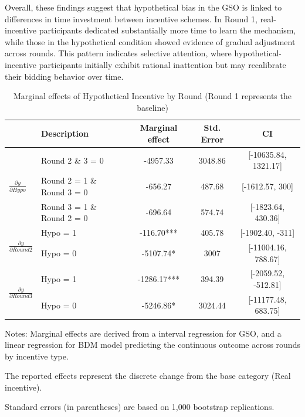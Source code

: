 \documentclass[12pt]{article}
\begin{document}
Overall, these findings suggest that hypothetical bias in the GSO is linked to differences in time investment between incentive schemes. In Round 1, real-incentive participants dedicated substantially more time to learn the mechanism, while those in the hypothetical condition showed evidence of gradual adjustment across rounds. This pattern indicates selective attention, where hypothetical-incentive participants initially exhibit rational inattention but may recalibrate their bidding behavior over time.

\begin{table}[H]
\centering
\footnotesize
\caption{Marginal effects of Hypothetical Incentive by Round (Round 1 represents the baseline)}
\label{tab: Marginal Effects by Round}
\begin{tabular}{llccc}
\toprule
 & Description & Marginal effect & Std. Error&CI \\
 \midrule
\multirow{3}{*}{$\frac{\partial y}{\partial Hypo}$} 
    & Round 2 \& 3 = 0 & -4957.33 & 3048.86 & [-10635.84, 1321.17]\\
    & Round 2 = 1 \& Round 3 = 0 & -656.27 & 487.68& [-1612.57, 300] \\
    & Round 3 = 1 \& Round 2 = 0 & -696.64 & 574.74& [-1823.64, 430.36] \\
\midrule
\multirow{2}{*}{$\frac{\partial y}{\partial Round2}$} 
    & Hypo = 1 & -116.70*** & 405.78& [-1902.40, -311] \\
    & Hypo = 0 & -5107.74* & 3007& [-11004.16, 788.67] \\
\midrule
\multirow{2}{*}{$\frac{\partial y}{\partial Round3}$} 
    & Hypo = 1 & -1286.17*** & 394.39& [-2059.52, -512.81] \\
    & Hypo = 0 & -5246.86* & 3024.44& [-11177.48, 683.75] \\
\bottomrule
\end{tabular}
\begin{tablenotes}
\footnotesize
\item Notes: Marginal effects are derived from a interval regression for GSO, and a linear regression for BDM model predicting the continuous outcome across rounds by incentive type.
\item The reported effects represent the discrete change from the base category (Real incentive).
\item Standard errors (in parentheses) are based on 1,000 bootstrap replications.
\end{tablenotes}
\end{table}
\end{document}
